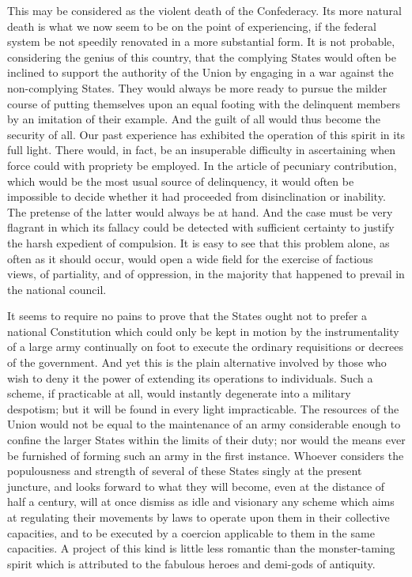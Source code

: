 This may be considered as the violent death of the Confederacy. 
Its more natural death is what we now seem to be on the point of experiencing, if the federal system be not speedily renovated in a more substantial form. 
It is not probable, considering the genius of this country, that the complying States would often be inclined to support the authority of the Union by engaging in a war against the non-complying States. 
They would always be more ready to pursue the milder course of putting themselves upon an equal footing with the delinquent members by an imitation of their example. 
And the guilt of all would thus become the security of all. 
Our past experience has exhibited the operation of this spirit in its full light. 
There would, in fact, be an insuperable difficulty in ascertaining when force could with propriety be employed. 
In the article of pecuniary contribution, which would be the most usual source of delinquency, it would often be impossible to decide whether it had proceeded from disinclination or inability. 
The pretense of the latter would always be at hand. 
And the case must be very flagrant in which its fallacy could be detected with sufficient certainty to justify the harsh expedient of compulsion. 
It is easy to see that this problem alone, as often as it should occur, would open a wide field for the exercise of factious views, of partiality, and of oppression, in the majority that happened to prevail in the national council.

It seems to require no pains to prove that the States ought not to prefer a national Constitution which could only be kept in motion by the instrumentality of a large army continually on foot to execute the ordinary requisitions or decrees of the government. 
And yet this is the plain alternative involved by those who wish to deny it the power of extending its operations to individuals. 
Such a scheme, if practicable at all, would instantly degenerate into a military despotism; but it will be found in every light impracticable. 
The resources of the Union would not be equal to the maintenance of an army considerable enough to confine the larger States within the limits of their duty; nor would the means ever be furnished of forming such an army in the first instance. 
Whoever considers the populousness and strength of several of these States singly at the present juncture, and looks forward to what they will become, even at the distance of half a century, will at once dismiss as idle and visionary any scheme which aims at regulating their movements by laws to operate upon them in their collective capacities, and to be executed by a coercion applicable to them in the same capacities. 
A project of this kind is little less romantic than the monster-taming spirit which is attributed to the fabulous heroes and demi-gods of antiquity.

